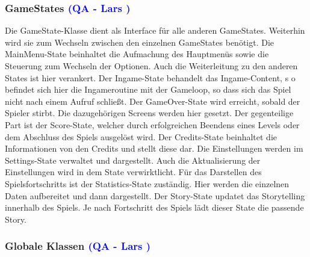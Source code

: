 \documentclass[12pt]{article}
\begin{document}
\vspace{1cm}
\subsubsection{GameStates \textcolor{blue}{(QA - Lars )}}

Die GameState-Klasse dient als Interface für alle anderen GameStates. Weiterhin wird sie zum Wechseln zwischen den einzelnen GameStates benötigt.\newline\newline
Die MainMenu-State beinhaltet die Aufmachung des Hauptmenüs sowie die Steuerung zum Wechseln der Optionen. Auch die Weiterleitung zu den
anderen States ist hier verankert.\newline\newline
Der Ingame-State behandelt das Ingame-Content, s o befindet sich hier die Ingameroutine mit der Gameloop, so dass sich das Spiel nicht nach einem Aufruf schließt.\newline\newline
Der GameOver-State wird erreicht, sobald der Spieler stirbt. Die dazugehörigen Screens werden hier gesetzt.\newline\newline
Der gegenteilige Part ist der Score-State, welcher durch erfolgreichen Beendens eines Levels oder dem Abschluss des Spiels ausgelöst wird.\newline\newline
Der Credits-State beinhaltet die Informationen von den Credits und stellt diese dar. Die Einstellungen werden im Settings-State verwaltet und dargestellt.
Auch die Aktualisierung der Einstellungen wird in dem State verwirktlicht.\newline\newline
Für das Darstellen des Spielsfortschritts ist der Statistics-State zuständig. Hier werden die einzelnen Daten aufbereitet und dann dargestellt.\newline\newline
Der Story-State updatet das Storytelling innerhalb des Spiels. Je nach Fortschritt des Spiels lädt dieser State die passende Story.

\vspace{1cm}
\subsubsection{Globale Klassen \textcolor{blue}{(QA - Lars )}}
\end{document}
